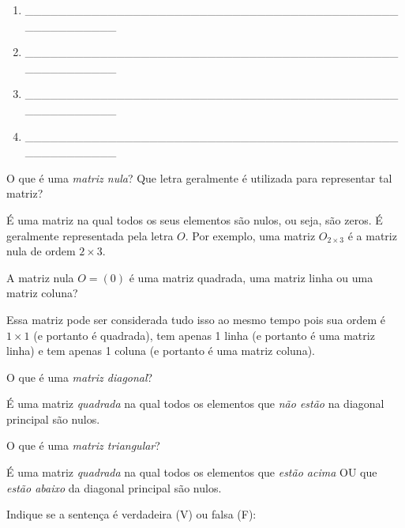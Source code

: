 \documentclass[pdftex, brazil, 12pt, oneside, addpoints]{exam}
\begin{document}
\begin{questions}
\begin{enumerate}
  \item \_\_\_\_\_\_\_\_\_\_\_\_\_\_\_\_\_\_\_\_\_\_\_\_\_\_\_\_\_\_\_\_\_\_\_\_\_\_\_\_\_\_\_\_\_\_\_\_\_\_\_\_\_\_\_\_
  \item \_\_\_\_\_\_\_\_\_\_\_\_\_\_\_\_\_\_\_\_\_\_\_\_\_\_\_\_\_\_\_\_\_\_\_\_\_\_\_\_\_\_\_\_\_\_\_\_\_\_\_\_\_\_\_\_
  \item \_\_\_\_\_\_\_\_\_\_\_\_\_\_\_\_\_\_\_\_\_\_\_\_\_\_\_\_\_\_\_\_\_\_\_\_\_\_\_\_\_\_\_\_\_\_\_\_\_\_\_\_\_\_\_\_
  \item \_\_\_\_\_\_\_\_\_\_\_\_\_\_\_\_\_\_\_\_\_\_\_\_\_\_\_\_\_\_\_\_\_\_\_\_\_\_\_\_\_\_\_\_\_\_\_\_\_\_\_\_\_\_\_\_    
\end{enumerate}
\fi

\ifprintanswers
\newpage
\fi

\question
O que é uma \emph{matriz nula}? Que letra geralmente é utilizada para representar tal matriz?
\begin{solutionorlines}[0.50in]
  É uma matriz na qual todos os seus elementos são nulos, ou seja, são zeros. É geralmente
  representada pela letra $O$. Por exemplo, uma matriz $O_{2 \times 3}$ é a matriz nula
  de ordem $2 \times 3$.
\end{solutionorlines}

\question
A matriz nula $O = (0)$ é uma matriz quadrada, uma matriz linha ou uma matriz coluna?
\begin{solutionorlines}[0.50in]
  Essa matriz pode ser considerada tudo isso ao mesmo tempo pois sua ordem é $1 \times 1$
  (e portanto é quadrada), tem apenas 1 linha (e portanto é uma matriz linha) e tem apenas
  1 coluna (e portanto é uma matriz coluna).
\end{solutionorlines}

\question
O que é uma \emph{matriz diagonal}?
\begin{solutionorlines}[0.50in]
  É uma matriz \emph{quadrada} na qual todos os elementos que \emph{não estão}
  na diagonal principal são nulos.
\end{solutionorlines}

\question
O que é uma \emph{matriz triangular}?
\begin{solutionorlines}[0.50in]
  É uma matriz \emph{quadrada} na qual todos os elementos que \emph{estão acima}
  OU que \emph{estão abaixo} da diagonal principal são nulos.
\end{solutionorlines}

\question
Indique se a sentença é verdadeira (V) ou falsa (F):
\begin{parts}

\end{parts}
\end{questions}
\end{document}
